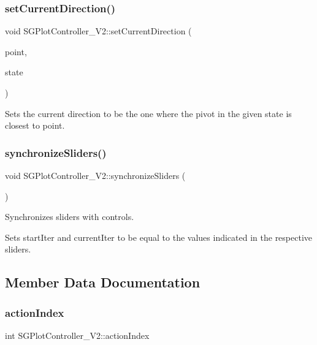 \subsubsection{\texorpdfstring{set\+Current\+Direction()}{setCurrentDirection()}}
{\footnotesize\ttfamily void S\+G\+Plot\+Controller\+\_\+\+V2\+::set\+Current\+Direction (\begin{DoxyParamCaption}\item[{\hyperlink{classSGPoint}{S\+G\+Point}}]{point,  }\item[{int}]{state }\end{DoxyParamCaption})}

Sets the current direction to be the one where the pivot in the given state is closest to point. \mbox{\label{classSGPlotController__V2_aefaae1f08f4bfebb55189f4440944eea}} 
\subsubsection{\texorpdfstring{synchronize\+Sliders()}{synchronizeSliders()}}
{\footnotesize\ttfamily void S\+G\+Plot\+Controller\+\_\+\+V2\+::synchronize\+Sliders (\begin{DoxyParamCaption}{ }\end{DoxyParamCaption})}



Synchronizes sliders with controls. 

Sets start\+Iter and current\+Iter to be equal to the values indicated in the respective sliders. 

\subsection{Member Data Documentation}
\mbox{\label{classSGPlotController__V2_a09f1c5963dd97f8f62f42ccad8f87a2a}} 
\subsubsection{\texorpdfstring{action\+Index}{actionIndex}}
{\footnotesize\ttfamily int S\+G\+Plot\+Controller\+\_\+\+V2\+::action\+Index\hspace{0.3cm}{\ttfamily [private]}}

